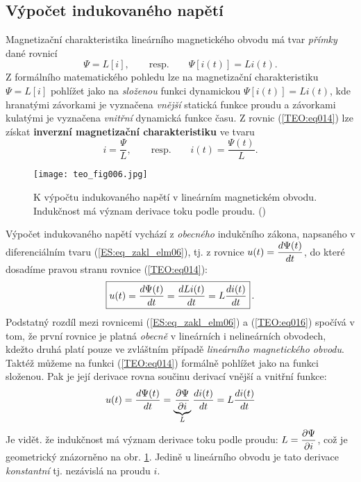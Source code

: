{    \subsection{Výpočet indukovaného napětí}
      Magnetizační charakteristika lineárního magnetického obvodu má tvar \emph{přímky} dané rovnicí
      \begin{equation}\label{TEO:eq014}
        \Psi = L[i], \qquad\text{resp.}\qquad \Psi[i(t)] = Li(t).
      \end{equation}
      Z formálního matematického pohledu lze na magnetizační charakteristiku \(\Psi = L[i]\) 
      pohlížet jako na \emph{složenou} funkci dynamickou \(\Psi[i(t)] = Li(t)\), kde hranatými 
      závorkami je vyznačena \emph{vnější} statická funkce proudu a závorkami kulatými je vyznačena 
      \emph{vnitřní} dynamická funkce času. Z rovnic (\ref{TEO:eq014}) lze získat \textbf{inverzní 
      magnetizační charakteristiku} ve tvaru
      \begin{equation}\label{TEO:eq015}
        i = \frac{\Psi}{L}, \qquad\text{resp.}\qquad i(t) = \frac{\Psi(t)}{L}.
      \end{equation}
      
      \begin{figure}[ht!]  %
        \centering
        \texttt{[image: teo\_fig006.jpg]}
        \caption{K výpočtu indukovaného napětí v lineárním magnetickém obvodu. Indukčnost má význam 
                 derivace toku podle proudu.
                (\cite[s.~154]{Patocka4})}
        \label{teo:fig006}
      \end{figure}
      Výpočet indukovaného napětí vychází z \emph{obecného} indukčního zákona, napsaného v 
      diferenciálním tvaru (\ref{ES:eq_zakl_elm06}), tj. z rovnice \(u(t) = \dfrac{d \Psi(t)}{d t}\), do 
      které dosadíme pravou stranu rovnice (\ref{TEO:eq014}):
      \begin{equation}\label{TEO:eq016}
        \boxed{u(t) = \dfrac{d \Psi(t)}{d t} = \dfrac{d Li(t)}{d t} = L\dfrac{d i(t)}{d t}}\,.
      \end{equation}
      Podstatný rozdíl mezi rovnicemi (\ref{ES:eq_zakl_elm06}) a (\ref{TEO:eq016}) spočívá v tom, 
      že první rovnice je platná \emph{obecně} v lineárních i nelineárních obvodech, kdežto druhá 
      platí pouze ve zvláštním případě \emph{lineárního magnetického obvodu}. Taktéž můžeme na 
      funkci (\ref{TEO:eq014}) formálně pohlížet jako na funkci složenou. Pak je její derivace 
      rovna součinu derivací vnější a vnitřní funkce:
      \begin{equation}\label{TEO:eq017}
        u(t) = \dfrac{d \Psi(t)}{d t} = \underbrace{\dfrac{\partial \Psi}{\partial i}}_L\dfrac{d i(t)}{d t} = L\dfrac{d i(t)}{d t}
      \end{equation}
      Je vidět. že indukčnost má význam derivace toku podle proudu: \(L = \dfrac{\partial \Psi}{\partial i}\), což je 
      geometrický znázorněno na obr. \ref{teo:fig006}. Jedině u lineárního obvodu je tato derivace 
      \emph{konstantní} tj. nezávislá na proudu \(i\).
      
}
